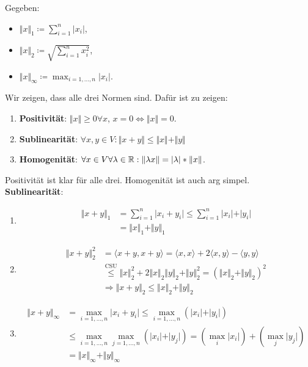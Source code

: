 \begin{problem*}[2]
  Gegeben:
  \begin{itemize}
    \item $ \Vert x \Vert_1 \coloneqq \sum_{i = 1}^n \vert x_i \vert $,
    \item $ \Vert x \Vert_2 \coloneqq \sqrt{\sum_{i=1}^n x_i^2} $,
    \item $ \Vert x \Vert_\infty \coloneqq \max_{i = 1,\dots,n}\vert x_i \vert $.
  \end{itemize}
  Wir zeigen, dass alle drei Normen sind. Dafür ist zu zeigen:
  \begin{enumerate}
     \item  \textbf{Positivität}: $ \Vert x \Vert \geq 0 \forall x $, $ x = 0 \Leftrightarrow \Vert x \Vert = 0 $.
     \item \textbf{Sublinearität}: $ \forall x, y \in V: \Vert x + y \Vert \leq \Vert x \Vert + \Vert y \Vert $
     \item \textbf{Homogenität}: $ \forall x \in V \forall \lambda \in \mathbb{R}: \Vert \lambda x \Vert = \vert \lambda \vert * \Vert x \Vert $.
  \end{enumerate}
  Positivität ist klar für alle drei. Homogenität ist auch arg simpel. \\
  \textbf{Sublinearität}:
  \begin{enumerate}
    \item \begin{align*}
      \Vert x + y \Vert_1 &= \sum_{i = 1}^n \vert x_i + y_i \vert \leq \sum_{i = 1}^n \vert x_i \vert + \vert y_i \vert \\
        &= \Vert x \Vert_1 + \Vert y \Vert_1
    \end{align*}
    \item \begin{align*}
      \Vert x + y \Vert^2_2 &= \langle x+y, x+y \rangle = \langle x, x \rangle + 2\langle x, y\rangle - \langle y, y \rangle \\
        &\overset{\text{CSU}}{\leq} \Vert x \Vert_2^2 + 2 \Vert x \Vert_2 \Vert y \Vert_2 + \Vert y \Vert_2^2 = (\Vert x \Vert_2 + \Vert y \Vert_2)^2 \\
        &\Rightarrow \Vert x +y \Vert_2 \leq \Vert x \Vert_2 + \Vert y \Vert_2
    \end{align*}
    \item \begin{align*}
      \Vert x + y \Vert_\infty &= \max_{i = 1, \dots,n} \vert x_i + y_i \vert \leq \max_{i = 1, \dots, n}(\vert x_i \vert + \vert y_i \vert) \\
        &\leq \max_{i = 1, \dots, n} \max_{j = 1, \dots, n}(\vert x_i \vert + \vert y_j \vert) = (\max_i \vert x_i \vert) + (\max_j \vert y_j \vert) \\
        &= \Vert x \Vert_\infty + \Vert y \Vert_\infty
    \end{align*}
  \end{enumerate}
\end{problem*}

